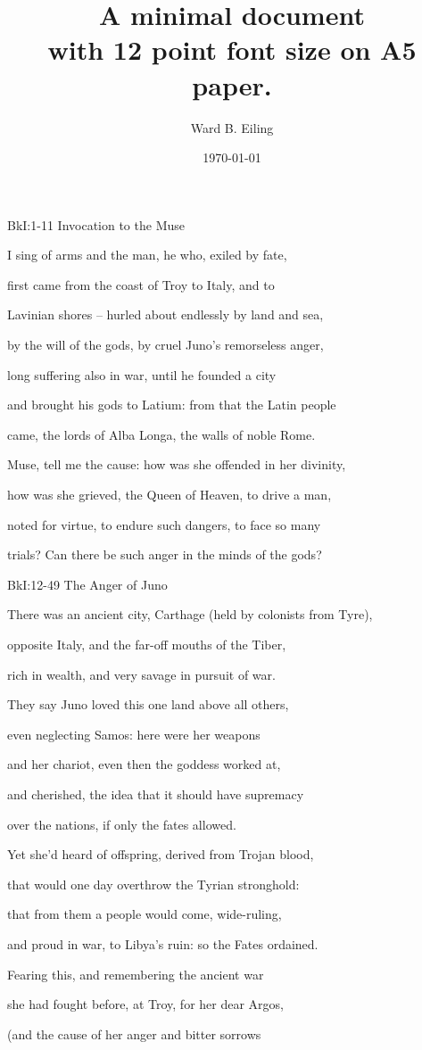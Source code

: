 \documentclass[12pt, a5paper]{minimal}
\title{A minimal document \\ \small with 12 point font size on A5 paper.}
\author{Ward B. Eiling}
\date{\today}
\begin{document}
BkI:1-11 Invocation to the Muse

I sing of arms and the man, he who, exiled by fate,

first came from the coast of Troy to Italy, and to

Lavinian shores – hurled about endlessly by land and sea,

by the will of the gods, by cruel Juno’s remorseless anger,

long suffering also in war, until he founded a city

and brought his gods to Latium: from that the Latin people

came, the lords of Alba Longa, the walls of noble Rome.

Muse, tell me the cause: how was she offended in her divinity,

how was she grieved, the Queen of Heaven, to drive a man,

noted for virtue, to endure such dangers, to face so many

trials? Can there be such anger in the minds of the gods?


BkI:12-49 The Anger of Juno



There was an ancient city, Carthage (held by colonists from Tyre),

opposite Italy, and the far-off mouths of the Tiber,

rich in wealth, and very savage in pursuit of war.

They say Juno loved this one land above all others,

even neglecting Samos: here were her weapons

and her chariot, even then the goddess worked at,

and cherished, the idea that it should have supremacy

over the nations, if only the fates allowed.

Yet she’d heard of offspring, derived from Trojan blood,

that would one day overthrow the Tyrian stronghold:

that from them a people would come, wide-ruling,

and proud in war, to Libya’s ruin: so the Fates ordained.

Fearing this, and remembering the ancient war

she had fought before, at Troy, for her dear Argos,

(and the cause of her anger and bitter sorrows
\end{document}
